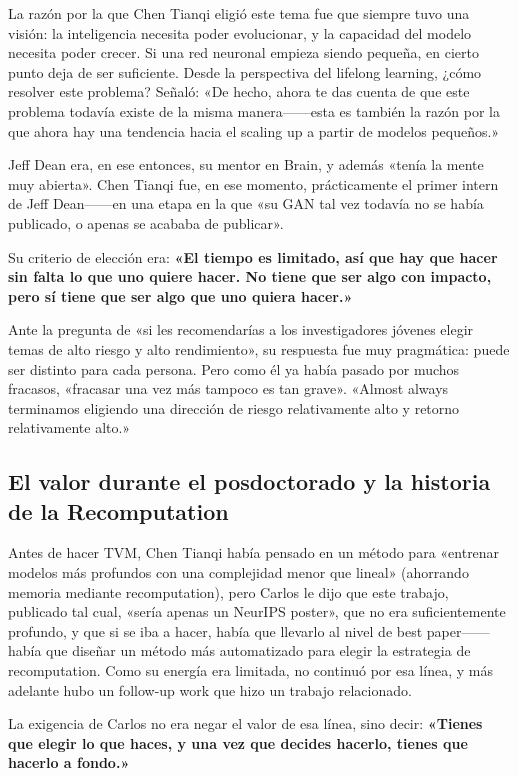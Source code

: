 \documentclass[a4paper]{article}
\begin{document}
La razón por la que Chen Tianqi eligió este tema fue que siempre tuvo una visión: la inteligencia necesita poder evolucionar, y la capacidad del modelo necesita poder crecer. Si una red neuronal empieza siendo pequeña, en cierto punto deja de ser suficiente. Desde la perspectiva del lifelong learning, ¿cómo resolver este problema? Señaló: «De hecho, ahora te das cuenta de que este problema todavía existe de la misma manera------esta es también la razón por la que ahora hay una tendencia hacia el scaling up a partir de modelos pequeños.»

Jeff Dean era, en ese entonces, su mentor en Brain, y además «tenía la mente muy abierta». Chen Tianqi fue, en ese momento, prácticamente el primer intern de Jeff Dean------en una etapa en la que «su GAN tal vez todavía no se había publicado, o apenas se acababa de publicar».

Su criterio de elección era: \textbf{«El tiempo es limitado, así que hay que hacer sin falta lo que uno quiere hacer. No tiene que ser algo con impacto, pero sí tiene que ser algo que uno quiera hacer.»}

Ante la pregunta de «si les recomendarías a los investigadores jóvenes elegir temas de alto riesgo y alto rendimiento», su respuesta fue muy pragmática: puede ser distinto para cada persona. Pero como él ya había pasado por muchos fracasos, «fracasar una vez más tampoco es tan grave». «Almost always terminamos eligiendo una dirección de riesgo relativamente alto y retorno relativamente alto.»

\subsection{El valor durante el posdoctorado y la historia de la Recomputation}

Antes de hacer TVM, Chen Tianqi había pensado en un método para «entrenar modelos más profundos con una complejidad menor que lineal» (ahorrando memoria mediante recomputation), pero Carlos le dijo que este trabajo, publicado tal cual, «sería apenas un NeurIPS poster», que no era suficientemente profundo, y que si se iba a hacer, había que llevarlo al nivel de best paper------había que diseñar un método más automatizado para elegir la estrategia de recomputation. Como su energía era limitada, no continuó por esa línea, y más adelante hubo un follow-up work que hizo un trabajo relacionado.

La exigencia de Carlos no era negar el valor de esa línea, sino decir: \textbf{«Tienes que elegir lo que haces, y una vez que decides hacerlo, tienes que hacerlo a fondo.»}
\end{document}
